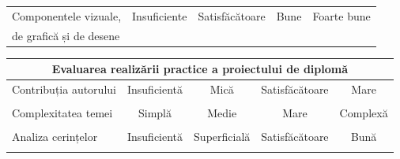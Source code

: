 \begin{flushleft}
\begin{tabular}{l l c c c c }
	\hline
	\midrule	
	\multicolumn{2}{l}{Componentele vizuale,}	& Insuficiente & Satisfăcătoare & Bune & Foarte bune \\
	\multicolumn{2}{l}{de grafică și de desene}	&
	\unCheckedBox\hspace{5pt}  &
	\unCheckedBox\hspace{5pt}  &
	\unCheckedBox\hspace{5pt}  &
	\unCheckedBox\hspace{5pt}  \\
	
	\bottomrule
	\end{tabular}
\end{flushleft}

\begin{flushleft}
\hspace*{-1.5cm}
\begin{tabular}{l l c c c c }
	\hline
	\toprule
	\multicolumn{6}{c}{\textbf{Evaluarea realizării practice a proiectului de diplomă}} \\
	
	\hline
	\toprule
	\multicolumn{2}{l}{Contribuția autorului} & 
	Insuficientă & Mică & Satisfăcătoare & Mare \\
	\multicolumn{2}{l}{}	&
	\unCheckedBox\hspace{5pt} & \unCheckedBox\hspace{5pt}  &
	\unCheckedBox\hspace{5pt}  &
	\unCheckedBox\hspace{5pt}  \\
		
	\hline
	\midrule
	\multicolumn{2}{l}{Complexitatea temei} & 
	Simplă & Medie & Mare & Complexă \\
	\multicolumn{2}{l}{}	&
	\unCheckedBox\hspace{5pt} & \unCheckedBox\hspace{5pt}  &
	\unCheckedBox\hspace{5pt}  &
	\unCheckedBox\hspace{5pt}  \\
	
	\hline
	\midrule
	\multicolumn{2}{l}{Analiza cerințelor} & 
	Insuficientă & Superficială & Satisfăcătoare & Bună \\
	\multicolumn{2}{l}{}	&
	\unCheckedBox\hspace{5pt} & \unCheckedBox\hspace{5pt}  &
	\unCheckedBox\hspace{5pt}  &
	\unCheckedBox\hspace{5pt}  \\
	

\end{tabular}
\end{flushleft}
